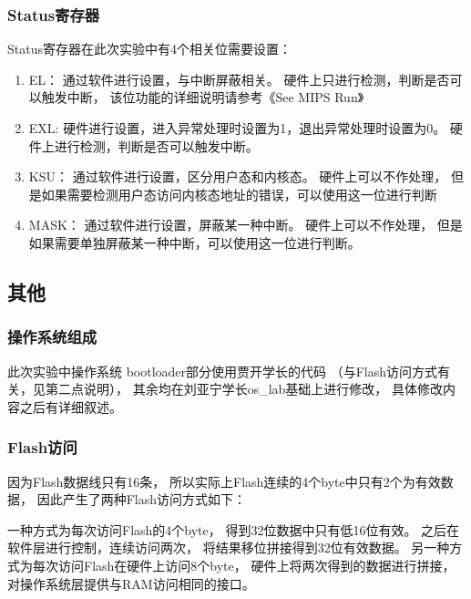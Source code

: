         \subsubsection{Status寄存器}
            Status寄存器在此次实验中有4个相关位需要设置：
            \begin{enumerate}
            \item
                EL：
                通过软件进行设置，与中断屏蔽相关。
                硬件上只进行检测，判断是否可以触发中断，
                该位功能的详细说明请参考《See MIPS Run》
            \item
                EXL:
                硬件进行设置，进入异常处理时设置为1，退出异常处理时设置为0。
                硬件上进行检测，判断是否可以触发中断。
            \item
                KSU：
                通过软件进行设置，区分用户态和内核态。
                硬件上可以不作处理，
                但是如果需要检测用户态访问内核态地址的错误，可以使用这一位进行判断
            \item
                MASK：
                通过软件进行设置，屏蔽某一种中断。
                硬件上可以不作处理，
                但是如果需要单独屏蔽某一种中断，可以使用这一位进行判断。
            \end{enumerate}


    \subsection{其他}
        \subsubsection{操作系统组成}
            此次实验中操作系统
            bootloader部分使用贾开学长的代码
            （与Flash访问方式有关，见第二点说明），
            其余均在刘亚宁学长os\_lab基础上进行修改，
            具体修改内容之后有详细叙述。

        \subsubsection{Flash访问}
            因为Flash数据线只有16条，
            所以实际上Flash连续的4个byte中只有2个为有效数据，
            因此产生了两种Flash访问方式如下：

            一种方式为每次访问Flash的4个byte，
            得到32位数据中只有低16位有效。
            之后在软件层进行控制，连续访问两次，
            将结果移位拼接得到32位有效数据。
            另一种方式为每次访问Flash在硬件上访问8个byte，
            硬件上将两次得到的数据进行拼接，
            对操作系统层提供与RAM访问相同的接口。

